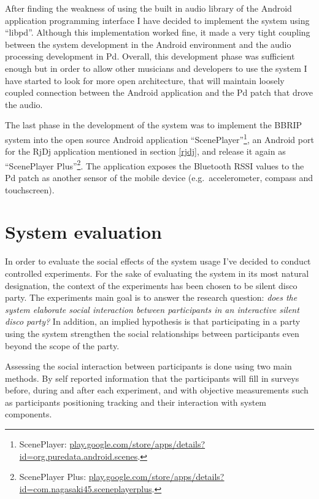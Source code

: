 \documentclass[a4paper,11pt]{article}
\begin{document}
{After finding the weakness of using the built in audio library of the Android application programming interface I have decided to implement the system using ``libpd''.
Although this implementation worked fine, it made a very tight coupling between the system development in the Android environment and the audio processing development in Pd.
Overall, this development phase was sufficient enough but in order to allow other musicians and developers to use the system I have started to look for more open architecture, that will maintain loosely coupled connection between the Android application and the Pd patch that drove the audio.

The last phase in the development of the system was to implement the BBRIP system into the open source Android application ``ScenePlayer''\footnote{ScenePlayer: \href{http://play.google.com/store/apps/details?id=org.puredata.android.scenes}{play.google.com/store/apps/details?id=org.puredata.android.scenes}.}, an Android port for the RjDj application mentioned in section \ref{rjdj}, and release it again as ``ScenePlayer Plus''\footnote{ScenePlayer Plus: \href{http://play.google.com/store/apps/details?id=com.nagasaki45.sceneplayerplus}{play.google.com/store/apps/details?id=com.nagasaki45.sceneplayerplus}.}.
The application exposes the Bluetooth RSSI values to the Pd patch as another sensor of the mobile device (e.g.\ accelerometer, compass and touchscreen).

\section{System evaluation}

In order to evaluate the social effects of the system usage I've decided to conduct controlled experiments.
For the sake of evaluating the system in its most natural designation, the context of the experiments has been chosen to be silent disco party.
The experiments main goal is to answer the research question: \emph{does the system elaborate social interaction between participants in an interactive silent disco party?}
In addition, an implied hypothesis is that participating in a party using the system strengthen the social relationships between participants even beyond the scope of the party.

Assessing the social interaction between participants is done using two main methods. By self reported information that the participants will fill in surveys before, during and after each experiment, and with objective measurements such as participants positioning tracking and their interaction with system components. 

}
\end{document}
